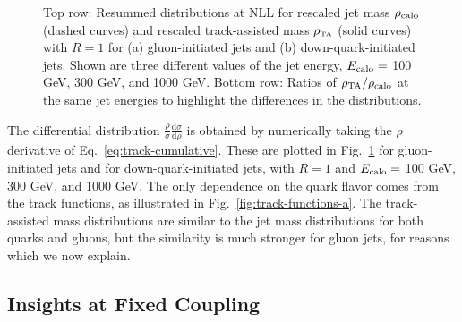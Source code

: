 \documentclass[letterpaper,11pt]{article}
\newcommand{\Fig}[1]{Fig.~\ref{#1}}
\newcommand{\Eq}[1]{Eq.~\eqref{#1}}
\begin{document}
\begin{figure}[t]
	\centering

	\caption{Top row:  Resummed distributions at NLL for rescaled jet mass $\rho_{\rm calo}$ (dashed curves) and rescaled track-assisted mass $\rho_{\mbox{\tiny TA}}$ (solid curves) with $R=1$ for (a) gluon-initiated jets and (b) down-quark-initiated jets.  Shown are three different values of the jet energy, $E_{\rm calo}=$ 100 GeV, 300 GeV, and 1000 GeV. Bottom row:  Ratios of $\rho_{\rm TA}/\rho_{\rm calo}$ at the same jet energies to highlight the differences in the distributions.}
	\label{fig:resummed-nogroom}
\end{figure}

The differential distribution $\frac{\rho}{\sigma}\frac{\text{d}\sigma}{\text{d}\rho}$ is obtained by numerically taking the $\rho$ derivative of \Eq{eq:track-cumulative}.
%
These are plotted in \Fig{fig:resummed-nogroom} for gluon-initiated jets and for down-quark-initiated jets, with $R=1$ and $E_{\rm calo} = $ 100 GeV, 300 GeV, and 1000 GeV. 
%
The only dependence on the quark flavor comes from the track functions, as illustrated in \Fig{fig:track-functions-a}.
%
The track-assisted mass distributions are similar to the jet mass distributions for both quarks and gluons, but the similarity is much stronger for gluon jets, for reasons which we now explain.



\subsection{Insights at Fixed Coupling}
\label{sec:insights}

\end{document}
